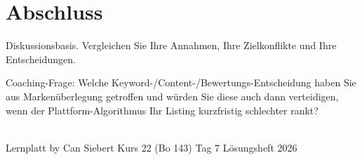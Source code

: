 \documentclass[11pt,a4paper,oneside]{article}
\begin{document}
\clearpage

\section*{Abschluss}
\thispagestyle{plain}

\noindent Diskussionsbasis. Vergleichen Sie Ihre Annahmen, Ihre Zielkonflikte und Ihre Entscheidungen.

\medskip
\begin{infobox}
Coaching-Frage: Welche Keyword-/Content-/Bewertungs-Entscheidung haben Sie aus Markenüberlegung getroffen \textendash{} und würden Sie diese auch dann verteidigen, wenn der Plattform-Algorithmus Ihr Listing kurzfristig schlechter rankt?
\end{infobox}

\vspace{1cm}
\noindent{\color{lpAccent}\rule{\linewidth}{0.6pt}}\\[4pt]
{\footnotesize\sffamily\color{lpGray}Lernplatt \textperiodcentered{} by Can Siebert \textperiodcentered{} Kurs 22 (Bo 143) \textperiodcentered{} Tag 7 \textperiodcentered{} Lösungsheft \textperiodcentered{} \textcopyright{} 2026}
\end{document}

